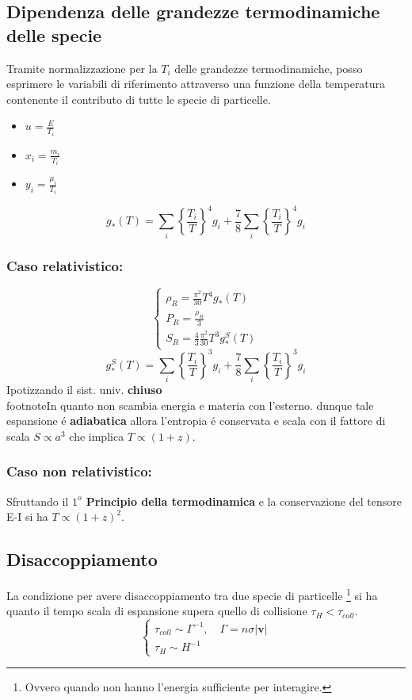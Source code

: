 \documentclass[12pt, a4paper]{article}
\begin{document}
\subsection{Dipendenza delle grandezze termodinamiche delle specie}
Tramite normalizzazione per la $T_i$ delle grandezze termodinamiche, posso esprimere le variabili di riferimento attraverso una funzione della temperatura contenente il contributo di tutte le specie di particelle.
\begin{itemize}
    \item $u=\frac{E}{T_i}$
    \item $x_i=\frac{m_i}{T_i}$
    \item $y_i=\frac{\mu_i}{T_i}$
\end{itemize}
\begin{equation}
    g_*(T)=\sum_i \left\{\frac{T_i}{T}\right\}^4 g_i+\frac{7}{8}\sum_i \left\{\frac{T_i}{T}\right\}^4 g_i
\end{equation}
\subsubsection{Caso relativistico:}
\begin{equation}
     \begin{cases}
        \rho_{R}=\frac{\pi^2}{30}T^4 g_*(T)
        \\
        P_R=\frac{\rho_{R}}{3}
        \\
        S_{R}=\frac{4}{3}\frac{\pi^2}{30}T^3 g_*^S(T)
     \end{cases}
\end{equation}
\begin{equation}
    g_*^S(T)=\sum_i \left\{\frac{T_i}{T}\right\}^3 g_i+\frac{7}{8}\sum_i \left\{\frac{T_i}{T}\right\}^3 g_i
\end{equation}
Ipotizzando il sist. univ. \textbf{chiuso} \\footnote{In quanto non scambia energia e materia con l'esterno.} dunque tale espansione \'{e} \textbf{adiabatica} allora l'entropia \'{e} conservata e scala con il fattore di scala $S\propto a^3$ che implica $T\propto(1+z)$.
\subsubsection{Caso non relativistico:}
Sfruttando il \textbf{$1^o$ Principio della termodinamica} e la conservazione del tensore E-I si ha $T\propto(1+z)^2$.
\subsection{Disaccoppiamento}
La condizione per avere disaccoppiamento  tra due specie di particelle \footnote{Ovvero quando non hanno l'energia sufficiente per interagire.} si ha quanto il tempo scala di espansione supera quello di collisione $\tau_H < \tau_{coll}$.
\begin{equation}
    \begin{cases}
    \tau_{coll}\sim \Gamma^{-1}, \quad \Gamma=n\sigma|\textbf{v}|
    \\
    \tau_{H}\sim H^{-1}
    \end{cases}
\end{equation}
\end{document}
